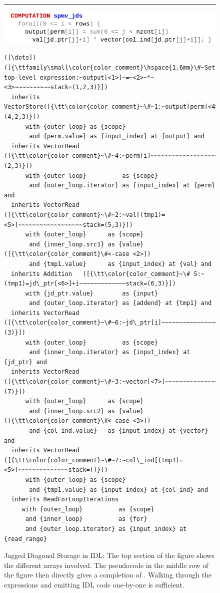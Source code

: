 \begin{figure}[p]
\vspace{0.8em}
\hrule
\vspace{0.3em}

\includegraphics[width=\linewidth]{figures/spmvjdswhat.pdf}
\vspace{-1.5em}
\begin{lstlisting}[language=IDL,firstnumber=7]
([\dots])([{\ttfamily\small\color{color_comment}\hspace{1.6mm}\#~Set top-level expression:~output[<1>]~=~<2>~*~<3>~~~~~~~~~~stack=(1,2,3)}])
  inherits VectorStore([{\tt\color{color_comment}~\#~1:~output[perm[<4>]]~~~~~~~~~~~~~~~~stack=(4,2,3)}])
      with {outer_loop} as {scope}
       and {perm.value} as {input_index} at {output} and
  inherits VectorRead ([{\tt\color{color_comment}~\#~4:~perm[i]~~~~~~~~~~~~~~~~~~~~~~~~~~stack=(2,3)}])
      with {outer_loop}          as {scope}
       and {outer_loop.iterator} as {input_index} at {perm} and
  inherits VectorRead ([{\tt\color{color_comment}~\#~2:~val[(tmp1)=<5>]~~~~~~~~~~~~~~~~~~stack=(5,3)}])
      with {outer_loop}      as {scope}
       and {inner_loop.src1} as {value}([{\tt\color{color_comment}\#<-case <2>])
       and {tmp1.value}      as {input_index} at {val} and
  inherits Addition   ([{\tt\color{color_comment}~\# 5:~(tmp1)=jd\_ptr[<6>]+i~~~~~~~~~~~~~stack=(6,3)}])
      with {jd_ptr.value}        as {input}
       and {outer_loop.iterator} as {addend} at {tmp1} and
  inherits VectorRead ([{\tt\color{color_comment}~\#~6:~jd\_ptr[i]~~~~~~~~~~~~~~~~~~~~~~~~stack=(3)}])
      with {outer_loop}          as {scope}
       and {inner_loop.iterator} as {input_index} at {jd_ptr} and
  inherits VectorRead ([{\tt\color{color_comment}~\#~3:~vector[<7>]~~~~~~~~~~~~~~~~~~~~~~stack=(7)}])
      with {outer_loop}      as {scope}
       and {inner_loop.src2} as {value}([{\tt\color{color_comment}\#<-case <3>])
       and {col_ind.value}   as {input_index} at {vector} and
  inherits VectorRead ([{\tt\color{color_comment}~\#~7:~col\_ind[(tmp1)=<5>]~~~~~~~~~~~~~~stack=()}])
      with {outer_loop} as {scope}
       and {tmp1.value} as {input_index} at {col_ind} and
  inherits ReadForLoopIterations
     with {outer_loop}          as {scope}
      and {inner_loop}          as {for}
      and {outer_loop.iterator} as {input_index} at {read_range}
\end{lstlisting}
\caption{Jagged Diagonal Storage in IDL:
         The top section of the figure shows the different arrays involved.
         The pseudocode in the middle row of the
         figure then directly gives a completion of .
         Walking through the expressions and emitting IDL code one-by-one is
         sufficient.}
\label{jds_lilacwhat_fig}
\end{figure}

